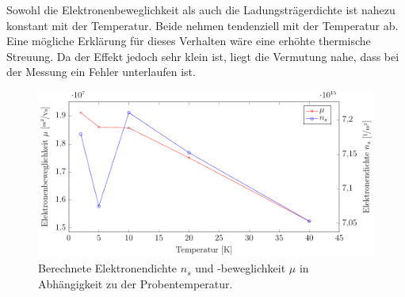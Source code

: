 Sowohl die Elektronenbeweglichkeit als auch die Ladungsträgerdichte ist nahezu konstant mit der Temperatur. Beide nehmen tendenziell mit der Temperatur ab. Eine mögliche Erklärung für dieses Verhalten wäre eine erhöhte thermische Streuung. Da der Effekt jedoch sehr klein ist, liegt die Vermutung nahe, dass bei der Messung ein Fehler unterlaufen ist.


\begin{figure}[h]
	\centering
	\includegraphics[scale=1]{graphs/temperatur/auswertung.pdf}
	\caption[Auswertung der Temperaturvariation]{
		Berechnete Elektronendichte $n_s$ und -beweglichkeit $\mu$ in Abhängigkeit zu der Probentemperatur.
	}
	\label{fig:temp_ausw}
\end{figure}

